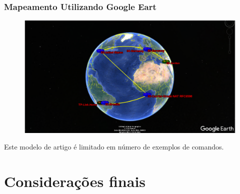 \documentclass[
	article,			%
	11pt,				%
	oneside,			%
	a4paper,			%
	english,			%
	brazil,				%
	sumario=tradicional
	]{abntex2}
\begin{document}
\subsubsection{Mapeamento Utilizando Google Eart }

\begin{figure}[!h]
	\centering
	\includegraphics[scale=0.2]{./google-earh.png}
	
	\label{Rotulo}
\end{figure}


Este modelo de artigo é limitado em número de exemplos de comandos.

% 

\section{Considerações finais}

\lipsum[1]

\begin{citacao}
\lipsum[2]
\end{citacao}

\lipsum[3]


\end{document}
